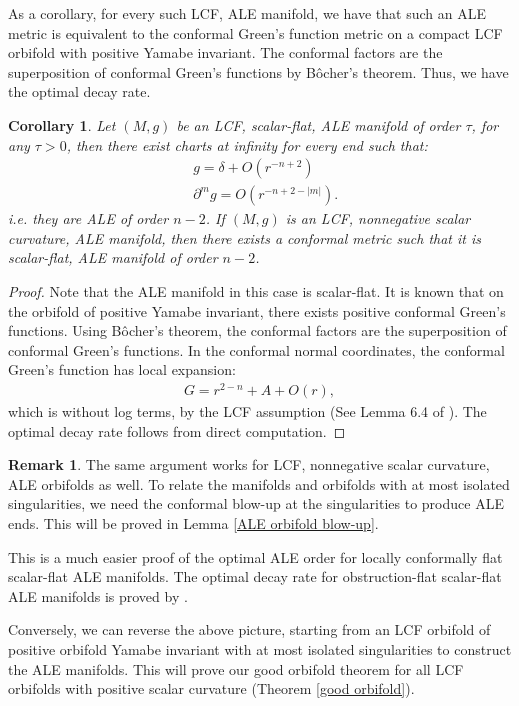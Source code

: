 \documentclass[12pt]{amsart}
\newtheorem{corollary}[theorem]{Corollary}
\theoremstyle{definition}
\newtheorem{remark}[theorem]{Remark}
\begin{document}
As a corollary, for every such LCF, ALE manifold, we have that such an ALE metric is equivalent to the conformal Green's function metric on a compact LCF orbifold with positive Yamabe invariant. The conformal factors are the superposition of conformal Green's functions by Bôcher's theorem. Thus, we have the optimal decay rate.

\begin{corollary}\label{order of decay}
    Let $(M,g)$ be an LCF, scalar-flat, ALE manifold of order $\tau$, for any $\tau >0$, then there exist charts at infinity for every end such that:
    \begin{align*}
    &g=\delta+O(r^{-n+2})\\
    &\partial^m g=O(r^{-n+2-|m|}).
    \end{align*}
    i.e. they are ALE of order $n-2$. If $(M,g)$ is an LCF, nonnegative scalar curvature, ALE manifold, then there exists a conformal metric such that it is scalar-flat, ALE manifold of order $n-2$.
\end{corollary}
\begin{proof} Note that the ALE manifold in this case is scalar-flat. It is known that on the orbifold of positive Yamabe invariant, there exists positive conformal Green's functions. Using Bôcher's theorem, the conformal factors are the superposition of conformal Green's functions. In the conformal normal coordinates, the conformal Green's function has local expansion:
\begin{align*}
    G = r^{2-n} + A + O(r),
\end{align*}
which is without log terms, by the LCF assumption (See Lemma 6.4 of \cite{lee1987yamabe}). The optimal decay rate follows from direct computation.
\end{proof}
\begin{remark}\label{remark of order of decay}
    The same argument works for LCF, nonnegative scalar curvature, ALE orbifolds as well. To relate the manifolds and orbifolds with at most isolated singularities, we need the conformal blow-up at the singularities to produce ALE ends. This will be proved in Lemma \ref{ALE orbifold blow-up}.
\end{remark}
This is a much easier proof of the optimal ALE order for locally conformally flat scalar-flat ALE manifolds. The optimal decay rate for obstruction-flat scalar-flat ALE manifolds is proved by \cite{AcheViaclovsky}.


Conversely, we can reverse the above picture, starting from an LCF orbifold of positive orbifold Yamabe invariant with at most isolated singularities to construct the ALE manifolds. This will prove our good orbifold theorem for all LCF orbifolds with positive scalar curvature (Theorem \ref{good orbifold}).
\end{document}
